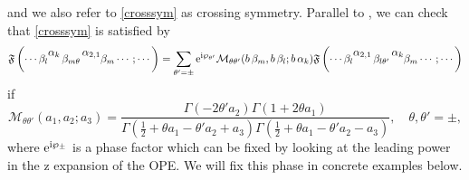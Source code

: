 \documentclass[11pt]{article}
\numberwithin{equation}{section}
\newcommand{\cM}{\ensuremath{\mathcal M}}
\newcommand{\ri}{{\rm i}}
\newcommand{\E}{{\mathrm e}}
\begin{document}
and we also refer to \eqref{crosssym} as crossing symmetry.
%
Parallel to \cite{Bonelli:2022ten}, we can check that \eqref{crosssym}  is satisfied by 
%
\begin{equation}
\label{conn_state}\mathfrak{F}\left( \cdots\beta_l\begin{matrix} \alpha_{k} \\ \, \end{matrix}  \,\beta_{m\theta} \, \begin{matrix} \alpha_{2,1} \\ \, \end{matrix}\beta_m\cdots ; \cdots \right)=\sum_{\theta'=\pm}\E^{\ri\wp_{\theta'}}\cM_{\theta\theta'}(b\,\beta_m,b\,\beta_l;b\,\alpha_k)\mathfrak{F}\left( \cdots\beta_l\begin{matrix} \alpha_{2,1} \\ \, \end{matrix}  \,\beta_{l\theta'} \, \begin{matrix} \alpha_{k} \\ \, \end{matrix}\beta_m\cdots ; \cdots \right)
\end{equation}
%
if 
\begin{equation}
\label{defM}\mathcal{M}_{\theta \theta'}(a_1,a_2;a_3) = \frac{\Gamma(-2\theta'a_2)\Gamma(1+2\theta a_1)}{\Gamma\left(\frac{1}{2}+\theta a_1-\theta' a_2 + a_3\right) \Gamma\left(\frac{1}{2}+\theta a_1-\theta' a_2 - a_3\right)},\quad \theta,\theta'=\pm,
\end{equation}
where $\E^{\ri\wp_{\pm}}$ is a phase factor which can be fixed by looking at the leading power in the z expansion of the OPE. We will fix this phase in concrete examples below.
\end{document}
